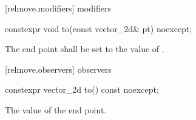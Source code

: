  [relmove.modifiers]{ modifiers}

\begin{itemdecl}
constexpr void to(const vector_2d& pt) noexcept;
\end{itemdecl}
\begin{itemdescr}
\pnum
\effects
The end point shall be set to the value of .
\end{itemdescr}

 [relmove.observers]{ observers}

\begin{itemdecl}
constexpr vector_2d to() const noexcept;
\end{itemdecl}
\begin{itemdescr}
\pnum
\returns
The value of the end point.
\end{itemdescr}

